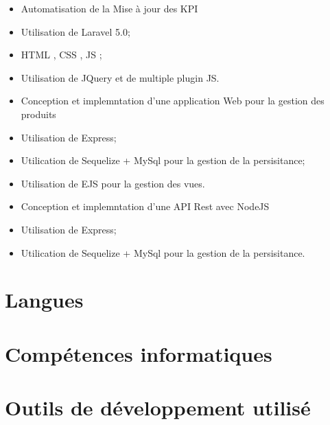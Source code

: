 \documentclass[11pt,a4paper]{moderncv}
\begin{document}
{%
\begin{itemize}%
	\item Automatisation de la Mise à jour des KPI
	\item Utilisation de Laravel 5.0;
	\item HTML , CSS , JS ;
	\item Utilisation de JQuery et de multiple plugin JS.
\end{itemize}}
%
{%
\begin{itemize}%
	\item Conception et implemntation d'une application Web pour la gestion des produits 
	\item Utilisation de Express;
	\item Utilication de Sequelize + MySql pour la gestion de la persisitance;
	\item Utilisation de EJS pour la gestion des vues.
\end{itemize}}
%
{%
\begin{itemize}%
	\item Conception et implemntation d'une API Rest avec NodeJS
	\item Utilisation de Express;
	\item Utilication de Sequelize + MySql pour la gestion de la persisitance.
\end{itemize}}
\section{Langues}
\section{Compétences informatiques}
\section{Outils de développement utilisé}
\newpage
\end{document}
